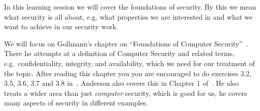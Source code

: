 In this learning session we will cover the foundations of security.
By this we mean what security is all about, e.g. what properties we are 
interested in and what we want to achieve in our security work.

We will focus on Gollmann's chapter on \enquote{Foundations of Computer 
Security}~\cite[Chap.\ 3]{Gollmann2011cs}.
There he attempts at a definition of Computer Security and related terms, 
e.g.~confidentiality, integrity, and availability, which we need for our 
treatment of the topic.
After reading this chapter you you are encouraged to do exercises 3.2, 3.5, 
3.6, 3.7 and 3.8 in\ \cite{Gollmann2011cs}.
Anderson also covers this in Chapter 1 of\ \cite{Anderson2008sea}.
He also treats a wider area than just \emph{computer} security, which is good 
for us, he covers many aspects of security in different examples.
